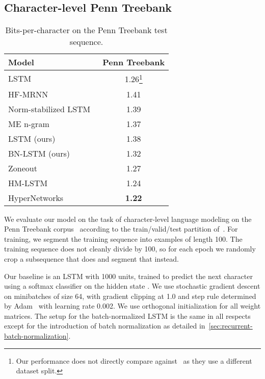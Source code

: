 \documentclass{article} \pdfoutput=1 \usepackage[utf8]{inputenc}
\begin{document}
\subsection{Character-level Penn Treebank}
\begin{table}\center
\begin{tabular}{@{}lc@{}}
  \toprule
  \bf Model & \bf Penn Treebank \\
  \midrule
  LSTM~\citep{graves2013generating} &  1.26\footnote{Our performance does not directly compare against~\citet{graves2013generating} as they use a different dataset split.}\\
  \midrule
  HF-MRNN~\citep{mikolov2012subword} & 1.41 \\
  Norm-stabilized LSTM~\citep{krueger} & 1.39 \\
  ME n-gram~\citep{mikolov2012subword} & 1.37 \\
  \midrule
  LSTM (ours) & 1.38 \\
  BN-LSTM (ours) & 1.32 \\
  \midrule
  Zoneout~\citep{krueger2016zoneout} & 1.27 \\
  HM-LSTM~\citep{chung2016hierarchical} & 1.24 \\
  HyperNetworks~\citep{ha2016hypernetworks} & \textbf{1.22} \\
  \bottomrule
\end{tabular}
\caption{Bits-per-character on the Penn Treebank test sequence.}
\label{tab:ptb_test}
\end{table}

We evaluate our model on the task of character-level language modeling on the
Penn Treebank corpus~\citep{penntreebank} according to the train/valid/test
partition of~\citet{mikolov2012subword}.  For training, we segment the training
sequence into examples of length 100.  The training sequence does not cleanly
divide by 100, so for each epoch we randomly crop a subsequence that does and
segment that instead.

Our baseline is an LSTM with 1000 units, trained to predict the next character
using a softmax classifier on the hidden state .  We use stochastic
gradient descent on minibatches of size 64, with gradient clipping at 1.0 and
step rule determined by Adam~\citep{kingma2014adam} with learning rate 0.002.
We use orthogonal initialization for all weight matrices.  The setup for the
batch-normalized LSTM is the same in all respects except for the introduction
of batch normalization as detailed in~\ref{sec:recurrent-batch-normalization}.
\end{document}
